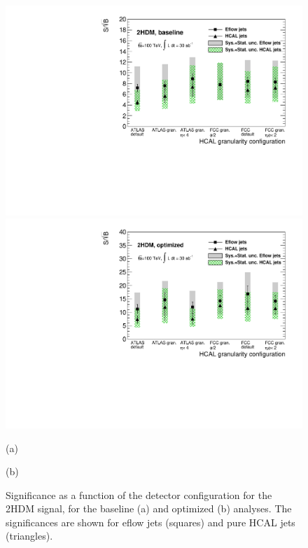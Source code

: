 \begin{figure}
	\centering
	\begin{minipage}{.5\textwidth}
		\centering
		\includegraphics[trim={.6cm 0 0 0},clip,width=\linewidth]{./Figures/SSBvsGran_2HDM.pdf}
	\end{minipage}%
	\begin{minipage}{.5\textwidth}
		\centering
		\includegraphics[trim={0 0 .6cm 0},clip,width=\linewidth]{./Figures/SSBvsGran_2HDM_Opt.pdf}
	\end{minipage}
	\begin{minipage}[t]{0.5\textwidth}
		\caption*{(a)}
	\end{minipage}%
	\hfill
	\begin{minipage}[t]{0.5\textwidth}
		\caption*{(b)}
	\end{minipage}
	\caption{Significance as a function of the detector configuration for the 2HDM signal, for the baseline (a) and optimized (b) analyses. The significances are shown for eflow jets (squares) and pure HCAL jets (triangles).}
	\label{fig:SSBvsGran3}
\end{figure}

